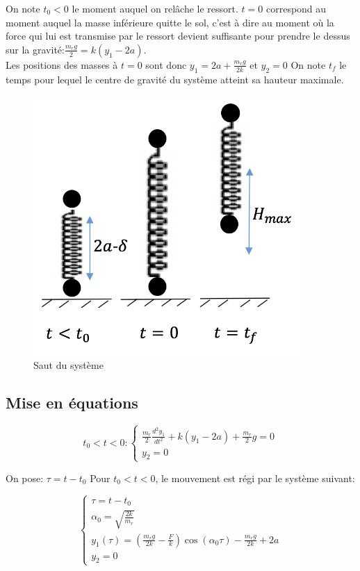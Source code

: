 On note $t_0<0$ le moment auquel on relâche le ressort. $t=0$ correspond au moment auquel la masse inférieure quitte le sol, c'est à dire au moment où la force qui lui est transmise par le ressort devient suffisante pour prendre le dessus sur la gravité:$\frac{m_r g}{2}=k(y_1-2a)$. \\
Les positions des masses à $t=0$ sont donc $y_1=2a+\frac{m_r g}{2k}$ et $y_2=0$
On note $t_f$ le temps pour lequel le centre de gravité du système atteint sa hauteur maximale.

\begin{figure}[htb]
\centering
\includegraphics[width=4in]{images_2ddl/saut.png}
\caption{Saut du système}
\label{fig:saut}
\end{figure}

\subsection{Mise en équations}
\begin{equation}
   t_0<t<0: 
  \begin{cases}
    \frac{m_r}{2}\frac{d^2y_1}{dt^2}+k(y_1-2a)+\frac{m_r}{2}g=0\\
    y_2=0
  \end{cases}
  \label{eq:1}
\end{equation}

On pose: $\tau=t-t_0$
Pour $t_0<t<0$, le mouvement est régi par le système suivant:

\begin{equation}
  \begin{cases}
    \tau=t-t_0 \\
    \alpha_0=\sqrt{\frac{2k}{m_r}}\\
    y_1(\tau)=(\frac{m_r g}{2k}-\frac{F}{k})\cos(\alpha_0 \tau)-\frac{m_r g}{2k}+2a \\
    y_2=0
  \end{cases}
  \label{eq:2}
\end{equation}


